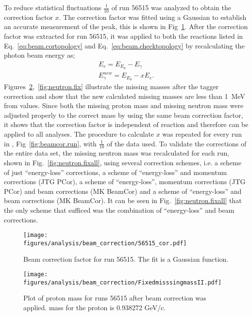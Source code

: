   To reduce statistical fluctuations $\frac{1}{10}$ of run 56515 was analyzed to obtain the correction factor $x$. The correction factor was fitted using a Gaussian to establish an accurate measurement of the peak, this is shown in Fig~\ref{fig:56515.cor}. After the correction factor was extracted for run 56515, it was applied to both the reactions listed in Eq.~\ref{eq:beam.cortopology} and Eq.~\ref{eq:beam.checktopology} by recalculating the photon beam energy as;
  \begin{align}
  E_e = E_{E_0} - E_{\gamma} \nonumber \\
  E_{\gamma}^{new} = E_{E_0} - xE_e \nonumber.
  \end{align}
  Figures~\ref{fig:proton.fix},~\ref{fig:neutron.fix} illustrate the missing masses after the tagger correction and show that the new calculated missing masses are less than 1~MeV from  values. Since both the missing proton mass and missing neutron mass were adjusted properly to the correct mass by using the same beam correction factor, it shows that the correction factor is independent of reaction and therefore can be applied to all  analyses. The procedure to calculate $x$ was repeated for every run in , Fig~\ref{fig:beamcor.run}, with $\frac{1}{10}$ of the data used. To validate the corrections of the entire  data set, the missing neutron mass was recalculated for each run, shown in  Fig.~\ref{fig:neutron.fixall}, using several correction schemes, i.e. a scheme of just ``energy-loss'' corrections, a scheme of ``energy-loss'' and momentum corrections (JTG PCor), a scheme of ``energy-loss'', momentum corrections (JTG PCor) and beam corrections (MK BeamCor) and a scheme of ``energy-loss'' and beam corrections (MK BeamCor). It can be seen in Fig.~\ref{fig:neutron.fixall} that the only scheme that sufficed was the combination of ``energy-loss'' and beam corrections.
  
  
  \begin{figure}[h!]\begin{center}
  \texttt{[image: \\figures/analysis/beam\_correction/56515\_cor.pdf]}
  \caption[Beam correction factor for run 56515]{\label{fig:56515.cor} Beam correction factor for run 56515. The fit is a Gaussian function.}
    \end{center}\end{figure}
    
    \begin{figure}[h!]\begin{center}
    \texttt{[image: \\figures/analysis/beam\_correction/FixedmisssingmassII.pdf]}
    \caption[Plot of proton mass for runs 56515 after beam correction was applied]{\label{fig:proton.fix} Plot of proton mass for runs 56515 after beam correction was applied.   mass for the proton is 0.938272 GeV/c.}
    \end{center}\end{figure}
    
